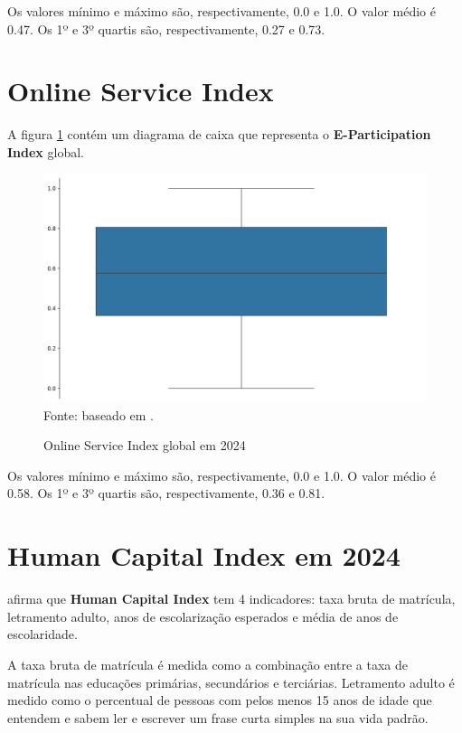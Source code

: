 Os valores mínimo e máximo são, respectivamente, 0.0 e 1.0. O  valor médio é 0.47. Os 1º e 3º quartis são, respectivamente, 0.27 e 0.73.

\section{Online Service Index}
\label{osi}

A figura \ref{fig:boxplot_osi_global} contém um diagrama de caixa que representa o \textbf{E-Participation Index} global.

\begin{figure}[H]
	\centering
	\caption{Online Service Index global em 2024}
	\includegraphics[width=1\linewidth]{figuras/egdi/boxplot_osi_global.png}
	\label{fig:boxplot_osi_global}
	\footnotesize{Fonte: baseado em \cite{ONU_EGDI_mapa}.}
\end{figure}

Os valores mínimo e máximo são, respectivamente, 0.0 e 1.0. O  valor médio é 0.58. Os 1º e 3º quartis são, respectivamente, 0.36 e 0.81.

\section{Human Capital Index em 2024}
\label{hci}

\cite{ONU_EGDI_methodology} afirma que \textbf{Human Capital Index} tem 4 indicadores: taxa bruta de matrícula, letramento adulto, anos de escolarização esperados e média de anos de escolaridade. 

A taxa bruta de matrícula é medida como a combinação entre a taxa de matrícula nas educações primárias, secundários e terciárias. Letramento adulto é medido como o percentual de pessoas com pelos menos 15 anos de idade que entendem e sabem ler e escrever um frase curta simples na sua vida padrão.

